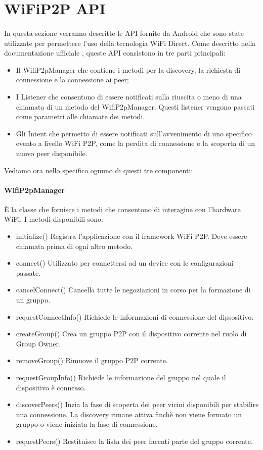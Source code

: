 \documentclass{llncs}
\begin{document}
\section{WiFiP2P API} 
\paragraph{}In questa sezione verranno descritte le API fornite da Android che sono state utilizzate per permettere l'uso della tecnologia WiFi Direct. Come descritto nella documentazione ufficiale \cite{android}, queste API consistono in tre parti principali:

\begin{itemize}
	\item Il WifiP2pManager che contiene i metodi per la discovery, la richiesta di connessione e la connessione ai peer;
	\item I Listener che consentono di essere notificati sulla riuscita o meno di una chiamata di un metodo del WifiP2pManager. Questi listener vengono passati come parametri alle chiamate dei metodi.
	\item Gli Intent che permetto di essere notificati sull'avvenimento di uno specifico evento a livello WiFi P2P, come la perdita di connessione o la scoperta di un nuovo peer disponibile.
\end{itemize}
Vediamo ora nello specifico ognuno di questi tre componenti:

\paragraph{WifiP2pManager}
È la classe che fornisce i metodi che consentono di interagine con l'hardware WiFi. I metodi disponibili sono:
\begin{itemize}
	\item{initialize()} Registra l'applicazione con il framework WiFi P2P. Deve essere chiamata prima di ogni altro metodo.
	\item{connect()} Utilizzato per connettersi ad un device con le configurazioni passate.
	\item{cancelConnect()} Cancella tutte le negoziazioni in corso per la formazione di un gruppo.
	\item{requestConnectInfo()} Richiede le informazioni di connessione del dipsositivo.
	\item{createGroup()} Crea un gruppo P2P con il dispositivo corrente nel ruolo di Group Owner.
	\item{removeGroup()} Rimuove il gruppo P2P corrente.
	\item{requestGroupInfo()} Richiede le informazione del gruppo nel quale il dispositivo è connesso.
	\item{discoverPeers()} Inzia la fase di scoperta dei peer vicini disponibili per stabilire una connessione. La discovery rimane attiva finchè non viene formato un gruppo o viene iniziata la fase di connessione.
	\item{requestPeers()} Restituisce la lista dei peer facenti parte del gruppo corrente.
\end{itemize}
\end{document}
